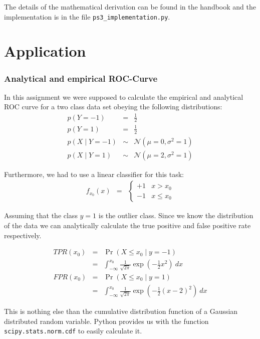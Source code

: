 \documentclass[a4paper, 11pt, titlepage]{article}
\begin{document}
The details of the mathematical derivation can be found in the handbook and the implementation is in the file \texttt{ps3\_implementation.py}.

\part{Application}
\label{part:application}

\section{Analytical and empirical ROC-Curve}

In this assignment we were supposed to calculate the empirical and analytical ROC curve for a two class data set obeying the following distributions:
\begin{eqnarray*}
	p(Y=-1) &=& \frac{1}{2}\\
	p(Y=1) &=& \frac{1}{2} \\
	p(X\mid Y=-1) &\sim& \mathcal{N}(\mu=0,\sigma^2 =1)\\
	p(X\mid Y=1) &\sim& \mathcal{N}(\mu=2,\sigma^2=1)
\end{eqnarray*}

Furthermore, we had to use a linear classifier for this task:
\begin{eqnarray*}
	f_{x_0}(x)&=& \begin{cases}
		+1 & x > x_0\\
		-1 & x \le x_0
	\end{cases}
\end{eqnarray*}

Assuming that the class $y=1$ is the outlier class.
Since we know the distribution of the data we can analytically calculate the true positive and false positive rate respectively.

\begin{eqnarray*}
	TPR(x_0) &=& \Pr(X \le x_0 \mid y=-1)\\
		&=& \int_{-\infty}^{x_0} \frac{1}{\sqrt{2\pi}}\exp(-\frac{1}{2}x^2)\ dx\\
	FPR(x_0) &=& \Pr(X \le x_0 \mid y=1)\\
		&=& \int_{-\infty}^{x_0} \frac{1}{\sqrt{2\pi}}\exp(-\frac{1}{2}(x-2)^2)\ dx
\end{eqnarray*}

This is nothing else than the cumulative distribution function of a Gaussian distributed random variable.
Python provides us with the function \texttt{scipy.stats.norm.cdf} to easily calculate it.
\end{document}
